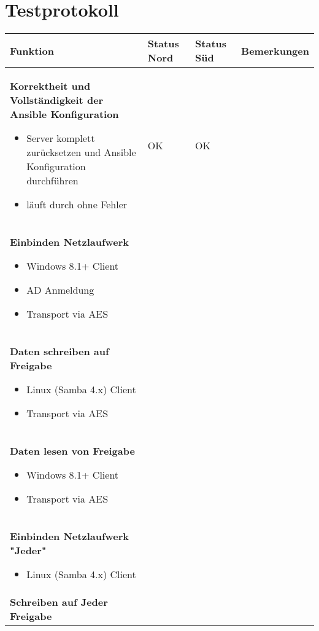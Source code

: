 \section{Testprotokoll}
\label{tab:massnahmen}
\begin{longtable}{p{6.8cm}p{2.4cm}p{2.4cm}p{3cm}}
\toprule
Funktion & Status Nord & Status Süd & Bemerkungen \\
\midrule
\textbf{Korrektheit und Vollständigkeit der Ansible Konfiguration }
\begin{itemize}
\item
  Server komplett zurücksetzen und Ansible Konfiguration durchführen
\item
  läuft durch ohne Fehler
\end{itemize} & OK & OK & \\
\midrule
\textbf{Einbinden Netzlaufwerk}

\begin{itemize}
\item
  Windows 8.1+ Client
\item
  AD Anmeldung
\item
  Transport via AES
\end{itemize} & & & \\
\midrule
\textbf{Daten schreiben auf Freigabe}

\begin{itemize}
\item
  Linux (Samba 4.x) Client
\end{itemize}

\begin{itemize}
\item
  Transport via AES
\end{itemize} & & & \\
\midrule
\textbf{Daten lesen von Freigabe}

\begin{itemize}
\item
  Windows 8.1+ Client
\item
  Transport via AES
\end{itemize} & & & \\
\midrule
\textbf{Einbinden Netzlaufwerk "Jeder"}

\begin{itemize}
\item
  Linux (Samba 4.x) Client
\end{itemize} & & & \\
\midrule
\textbf{Schreiben auf Jeder Freigabe }


\end{longtable}
